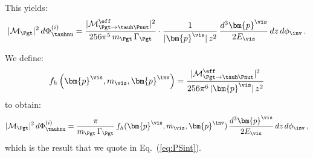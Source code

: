 This yields:
\begin{equation}
 \vert\mathcal{M}_{\Pgt}\vert^{2} \,
 d\Phi^{(i)}_{\tauhnu} = \frac{\vert\mathcal{M}^{\eff}_{\Pgt \to
  \tauh\Pnut}\vert^{2}}{256\pi^{5}\, m_{\Pgt} \, \Gamma_{\Pgt}} \cdot 
    \frac{1}{\vert\bm{p}^{\vis}\vert \, z^{2}} \, 
    \frac{d^{3}\bm{p}^{\vis}}{2 E_{\vis}} \, dz \, d\phi_{\inv} \, .
\label{eq:hadTauDecaysResult}
\end{equation}

We define:
\begin{equation}
f_{h}\left(\bm{p}^{\vis}, m_{\vis}, \bm{p}^{\inv}\right) = 
  \frac{\vert\mathcal{M}^{\eff}_{\Pgt \to
  \tauh\Pnut}\vert^{2}}{256\pi^{6} \, \vert\bm{p}^{\vis}\vert \, z^{2}} 
\label{eq:hadTauDecays_f}
\end{equation}
to obtain:
\begin{equation}
\vert\mathcal{M}_{\Pgt}\vert^{2} \,
 d\Phi^{(i)}_{\tauhnu} = \frac{\pi}{m_{\Pgt} \, \Gamma_{\Pgt}} \,
 f_{h}(\bm{p}^{\vis}, m_{\vis}, \bm{p}^{\inv}) \, \frac{d^{3}\bm{p}^{\vis}}{2 E_{\vis}} \, dz \, d\phi_{\inv}
 \, ,
\end{equation}
which is the result that we quote in Eq.~(\ref{eq:PSint}).
